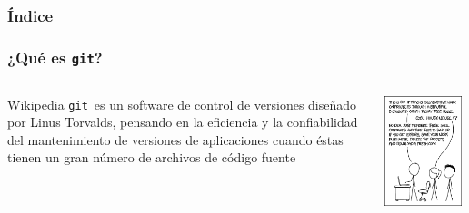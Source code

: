 \documentclass{beamer}
\title{\titulo}
\author{\autor}
\institute[IDR/UPM]{IDR/UPM}
\date{\fecha}
\newcommand{\git}{\texttt{git}}
\begin{document}
	
\maketitle

\begin{frame}\frametitle{Índice}
	\tableofcontents
\end{frame}



\begin{frame}[t]\frametitle{¿Qué es \git?}
	\begin{columns}
		\begin{column}{0.5\textwidth}
			\begin{block}{Wikipedia}
				\git\ es un software de control de versiones diseñado por Linus Torvalds, pensando en la eficiencia y la confiabilidad del mantenimiento de versiones de aplicaciones cuando éstas tienen un gran número de archivos de código fuente
			\end{block}
		\end{column}
		\begin{column}{0.5\textwidth}
			\centering
			\includegraphics[width=0.95\textwidth]{fig/git}
		\end{column}
	\end{columns}
\end{frame}
\end{document}
